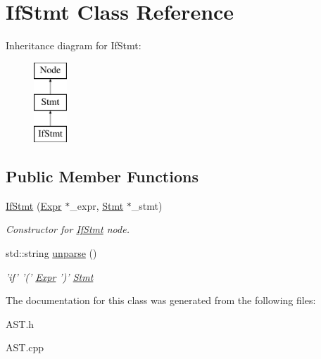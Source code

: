 \hypertarget{classIfStmt}{\section{If\-Stmt Class Reference}
\label{classIfStmt}
}
Inheritance diagram for If\-Stmt\-:\begin{figure}[H]
\begin{center}
\leavevmode
\includegraphics[height=3.000000cm]{classIfStmt}
\end{center}
\end{figure}
\subsection*{Public Member Functions}
\begin{DoxyCompactItemize}
\item 
\hypertarget{classIfStmt_aa80ac539cb4b0f81f85179bd0b8a59e4}{\hyperlink{classIfStmt_aa80ac539cb4b0f81f85179bd0b8a59e4}{If\-Stmt} (\hyperlink{classExpr}{Expr} $\ast$\-\_\-expr, \hyperlink{classStmt}{Stmt} $\ast$\-\_\-stmt)}\label{classIfStmt_aa80ac539cb4b0f81f85179bd0b8a59e4}

\begin{DoxyCompactList}\small\item\em Constructor for \hyperlink{classIfStmt}{If\-Stmt} node. \end{DoxyCompactList}\item 
\hypertarget{classIfStmt_a615e8785edb068f24e19f3ce7863f2ce}{std\-::string \hyperlink{classIfStmt_a615e8785edb068f24e19f3ce7863f2ce}{unparse} ()}\label{classIfStmt_a615e8785edb068f24e19f3ce7863f2ce}

\begin{DoxyCompactList}\small\item\em 'if' '(' \hyperlink{classExpr}{Expr} ')' \hyperlink{classStmt}{Stmt} \end{DoxyCompactList}\end{DoxyCompactItemize}


The documentation for this class was generated from the following files\-:\begin{DoxyCompactItemize}
\item 
A\-S\-T.\-h\item 
A\-S\-T.\-cpp\end{DoxyCompactItemize}
